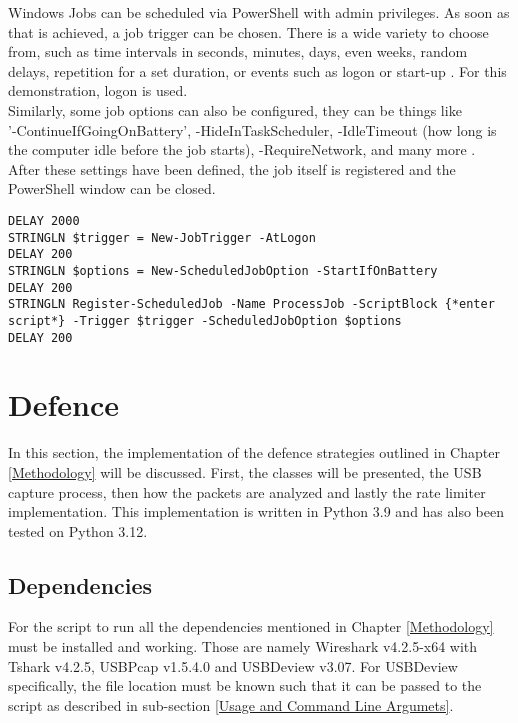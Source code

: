 Windows Jobs can be scheduled via PowerShell with admin privileges. As soon as that is achieved, a job trigger can be chosen. There is a wide variety to choose from, such as time intervals in seconds, minutes, days, even weeks, random delays, repetition for a set duration, or events such as logon or start-up \cite{sdwheelerNewJobTriggerPSScheduledJobPowerShell}.
For this demonstration, logon is used. \\
Similarly, some job options can also be configured, they can be things like \\ '-ContinueIfGoingOnBattery', -HideInTaskScheduler, -IdleTimeout (how long is the computer idle before the job starts), -RequireNetwork, and many more \cite{sdwheelerSetScheduledJobOptionPSScheduledJobPowerShell}. \\
After these settings have been defined, the job itself is registered and the PowerShell window can be closed. \\


\begin{lstlisting}[caption={Excerpt: register a scheduled job via PowerShell}, captionpos=b]
DELAY 2000
STRINGLN $trigger = New-JobTrigger -AtLogon
DELAY 200
STRINGLN $options = New-ScheduledJobOption -StartIfOnBattery
DELAY 200
STRINGLN Register-ScheduledJob -Name ProcessJob -ScriptBlock {*enter script*} -Trigger $trigger -ScheduledJobOption $options
DELAY 200
\end{lstlisting}


\section{Defence}

In this section, the implementation of the defence strategies outlined in Chapter \ref{Methodology} will be discussed. First, the classes will be presented, the USB capture process, then how the packets are analyzed and lastly the rate limiter implementation. 
This implementation is written in Python 3.9 and has also been tested on Python 3.12.

\subsection{Dependencies}

For the script to run all the dependencies mentioned in Chapter \ref{Methodology} must be installed and working. Those are namely Wireshark v4.2.5-x64 with Tshark v4.2.5, USBPcap v1.5.4.0 and USBDeview v3.07. For USBDeview specifically, the file location must be known such that it can be passed to the script as described in sub-section \ref{Usage and Command Line Argumets}.



